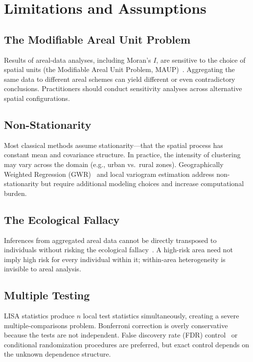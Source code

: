 \documentclass[conference]{IEEEtran}
\theoremstyle{definition}
\begin{document}
\section{Limitations and Assumptions}
\label{sec:limits}

\subsection{The Modifiable Areal Unit Problem}

Results of areal-data analyses, including Moran's $I$, are sensitive to the choice of spatial units (the Modifiable Areal Unit Problem, MAUP)~\cite{openshaw1984}. Aggregating the same data to different areal schemes can yield different or even contradictory conclusions. Practitioners should conduct sensitivity analyses across alternative spatial configurations.

\subsection{Non-Stationarity}

Most classical methods assume stationarity---that the spatial process has constant mean and covariance structure. In practice, the intensity of clustering may vary across the domain (e.g., urban vs.\ rural zones). Geographically Weighted Regression (GWR)~\cite{fotheringham2002} and local variogram estimation address non-stationarity but require additional modeling choices and increase computational burden.

\subsection{The Ecological Fallacy}

Inferences from aggregated areal data cannot be directly transposed to individuals without risking the ecological fallacy~\cite{robinson1950}. A high-risk area need not imply high risk for every individual within it; within-area heterogeneity is invisible to areal analysis.

\subsection{Multiple Testing}

LISA statistics produce $n$ local test statistics simultaneously, creating a severe multiple-comparisons problem. Bonferroni correction is overly conservative because the tests are not independent. False discovery rate (FDR) control~\cite{benjamini1995} or conditional randomization procedures are preferred, but exact control depends on the unknown dependence structure.
\end{document}
